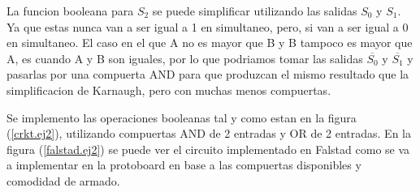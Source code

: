 \documentclass[chaptersright]{informeutn}
\begin{document}
    La funcion booleana para $S_2$ se puede simplificar utilizando las salidas $S_0$ y $S_1$. Ya que estas nunca van
    a ser igual a 1 en simultaneo, pero, si van a ser igual a 0 en simultaneo. El caso en el que A no es mayor que B y
    B tampoco es mayor que A, es cuando A y B son iguales, por lo que podriamos tomar las salidas $\overline{S_0}$ y
    $\overline{S_1}$ y pasarlas por una compuerta AND para que produzcan el mismo resultado que la simplificacion de
    Karnaugh, pero con muchas menos compuertas.

    Se implemento las operaciones booleanas tal y como estan en la figura (\ref{crkt.ej2}), utilizando compuertas AND
    de 2 entradas y OR de 2 entradas. En la figura (\ref{falstad.ej2}) se puede ver el circuito implementado en Falstad
    como se va a implementar en la protoboard en base a las compuertas disponibles y comodidad de armado.
\end{document}

